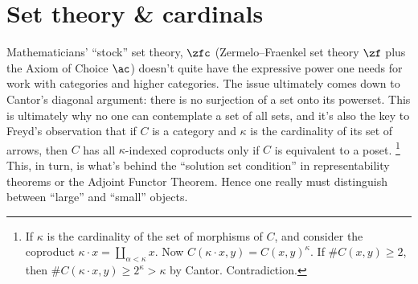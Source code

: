 
\chapter{Set theory \& cardinals}%
\label{cha:cardinals}

Mathematicians' \enquote{stock} set theory, $\zfc$
(Zermelo--Fraenkel set theory $\zf$ plus the Axiom of Choice $\ac$)
doesn't quite have the expressive power one needs for work with categories and higher categories.
The issue ultimately comes down to Cantor's diagonal argument:
there is no surjection of a set onto its powerset.
This is ultimately why no one can contemplate a set of all sets,
and it's also the key to Freyd's observation that
if $C$ is a category and $\kappa$ is the cardinality of its set of arrows,
then $C$ has all $\kappa$-indexed coproducts only if $C$ is equivalent to a poset.%
\footnote{
  If $\kappa$ is the cardinality of the set of morphisms of $C$, and consider the coproduct $\kappa \cdot x = \coprod_{\alpha < \kappa} x$.
  Now $C(\kappa \cdot x, y) = C(x,y)^{\kappa}$.
  If $\# C(x,y) \geq 2$, then $\# C(\kappa\cdot x, y) \geq 2^\kappa > \kappa$ by Cantor. Contradiction.
}
This, in turn, is what's behind the \enquote{solution set condition}
in representability theorems or the Adjoint Functor Theorem.
Hence one really must distinguish between \enquote{large} and \enquote{small} objects.

